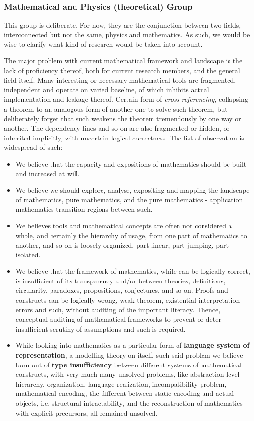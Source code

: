 \documentclass[9pt,a4paper]{article}
\begin{document}
\subsubsection{Mathematical and Physics (theoretical) Group}

This group is deliberate. For now, they are the conjunction between two fields, interconnected but not the same, physics and mathematics. As such, we would be wise to clarify what kind of research would be taken into account. 

The major problem with current mathematical framework and landscape is the lack of proficiency thereof, both for current research members, and the general field itself. Many interesting or necessary mathematical tools are fragmented, independent and operate on varied baseline, of which inhibits actual implementation and leakage thereof. Certain form of \textit{cross-referencing}, collapsing a theorem to an analogous form of another one to solve such theorem, but deliberately forget that such weakens the theorem tremendously by one way or another. The dependency lines and so on are also fragmented or hidden, or inherited implicitly, with uncertain logical correctness. The list of observation is widespread of such:

\begin{itemize}[itemsep=1pt,topsep=0pt]
    \item We believe that the capacity and expositions of mathematics should be built and increased at will. 
    \item We believe we should explore, analyse, expositing and mapping the landscape of mathematics, pure mathematics, and the pure mathematics - application mathematics transition regions between such. 
    \item We believes tools and mathematical concepts are often not considered a whole, and certainly the hierarchy of usage, from one part of mathematics to another, and so on is loosely organized, part linear, part jumping, part isolated. 
    \item We believe that the framework of mathematics, while can be logically correct, is insufficient of its transparency and/or between theories, definitions, circularity, paradoxes, propositions, conjectures, and so on. Proofs and constructs can be logically wrong, weak theorem, existential interpretation errors and such, without auditing of the important literacy. Thence, conceptual auditing of mathematical frameworks to prevent or deter insufficient scrutiny of assumptions and such is required. 
    \item While looking into mathematics as a particular form of \textbf{language system of representation}, a modelling theory on itself, such said problem we believe born out of \textbf{type insufficiency} between different systems of mathematical constructs, with very much many unsolved problems, like abstraction level hierarchy, organization, language realization, incompatibility problem, mathematical encoding, the different between static encoding and actual objects, i.e. structural intractability, and the reconstruction of mathematics with explicit precursors, all remained unsolved. 
\end{itemize}
\end{document}
